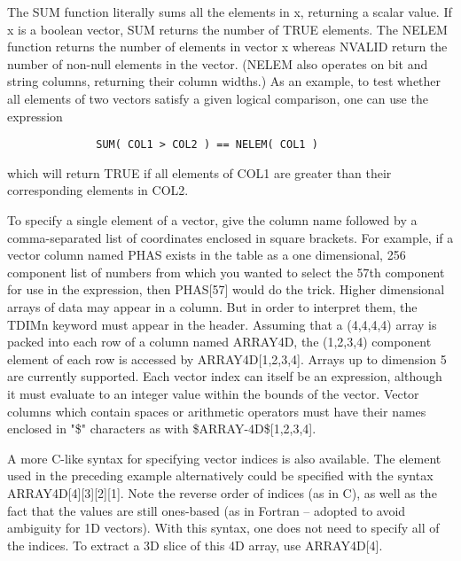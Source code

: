 \documentclass[11pt]{book}
\begin{document}
    The SUM function literally sums all  the elements in x,  returning a
    scalar value.   If x  is  a  boolean  vector, SUM returns the number
    of TRUE elements. The NELEM function  returns the number of elements
    in vector x whereas NVALID return the number of non-null elements in
    the  vector.   (NELEM  also  operates  on  bit  and string  columns,
    returning their column widths.)  As an example, to  test whether all
    elements of two vectors satisfy a  given logical comparison, one can
    use the expression

\begin{verbatim}
              SUM( COL1 > COL2 ) == NELEM( COL1 )
\end{verbatim}

    which will return TRUE if all elements  of  COL1  are  greater  than
    their corresponding elements in COL2.

    To  specify  a  single  element  of  a  vector, give the column name
    followed by  a  comma-separated  list  of  coordinates  enclosed  in
    square  brackets.  For example, if a vector column named PHAS exists
    in the table as a one dimensional, 256  component  list  of  numbers
    from  which  you  wanted to select the 57th component for use in the
    expression, then PHAS[57] would do the  trick.   Higher  dimensional
    arrays  of  data  may appear in a column.  But in order to interpret
    them, the TDIMn keyword must appear in the header.  Assuming that  a
    (4,4,4,4)  array  is packed into each row of a column named ARRAY4D,
    the  (1,2,3,4)  component  element  of  each  row  is  accessed   by
    ARRAY4D[1,2,3,4].    Arrays   up   to   dimension  5  are  currently
    supported.  Each vector index can itself be an expression,  although
    it  must  evaluate  to  an  integer  value  within the bounds of the
    vector.  Vector columns which contain spaces or arithmetic operators
    must   have   their   names  enclosed  in  "\$"  characters  as  with
    \$ARRAY-4D\$[1,2,3,4].

    A  more  C-like  syntax  for  specifying  vector  indices  is   also
    available.   The element used in the preceding example alternatively
    could be specified with the syntax  ARRAY4D[4][3][2][1].   Note  the
    reverse  order  of  indices  (as in C), as well as the fact that the
    values are still ones-based (as  in  Fortran  --  adopted  to  avoid
    ambiguity  for  1D vectors).  With this syntax, one does not need to
    specify all of the indices.  To  extract  a  3D  slice  of  this  4D
    array, use ARRAY4D[4].
\end{document}
